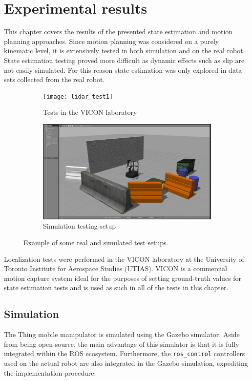 \documentclass[times, utf8, diplomski, english]{fer}
\begin{document}
\chapter{Experimental results}
This chapter covers the results of the presented state estimation and motion planning approaches.
Since motion planning was considered on a purely kinematic level, it is extensively tested in both simulation and on the real robot.
State estimation testing proved more difficult as dynamic effects such as slip are not easily simulated.
For this reason state estimation was only explored in data sets collected from the real robot.
\begin{figure}[h]
    \centering
    \begin{subfigure}[t]{0.45\textwidth}
        \texttt{[image: lidar\_test1]}
        \caption{Tests in the VICON laboratory}
        \label{figure:VICONtest}
    \end{subfigure}
    \begin{subfigure}[t]{0.45\textwidth}
        \includegraphics[trim={25cm 2.5cm 10cm 8cm},clip,width=\textwidth]{gazebo_screenshot1}
        \caption{Simulation testing setup}
        \label{figure:simulationtest}
    \end{subfigure}
    \caption{Example of some real and simulated test setups.}\label{fig:resultsphotos}
\end{figure}
Localization tests were performed in the VICON laboratory at the University of Toronto Institute for Aerospace Studies (UTIAS).
VICON is a commercial motion capture system ideal for the purposes of setting ground-truth values for state estimation tests and is used as such in all of the tests in this chapter. 
\section{Simulation}
The Thing mobile manipulator is simulated using the Gazebo simulator.
Aside from being open-source, the main advantage of this simulator is that it is fully integrated within the ROS ecosystem.
Furthermore, the \verb|ros_control| controllers used on the actual robot are also integrated in the Gazebo simulation, expediting the implementation procedure.
\end{document}
